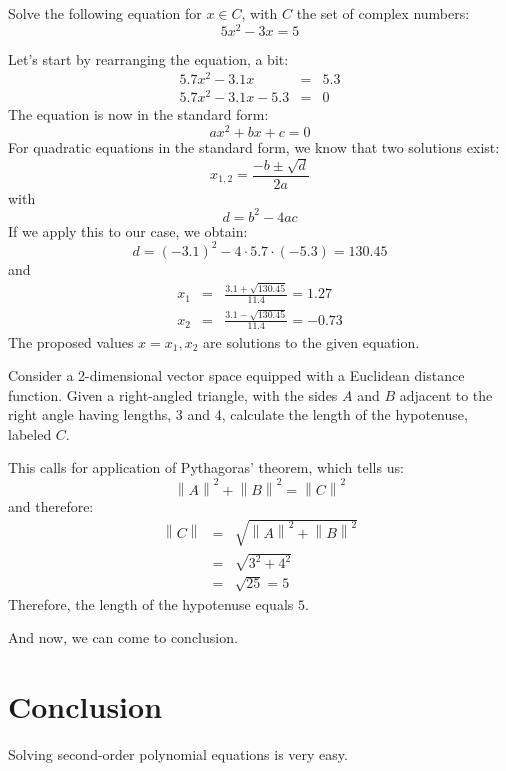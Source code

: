 \documentclass[a4paper,10pt]{article}
\begin{document}
\begin{exercises}[columns = 2]

  \begin{exercise}
    Solve the following equation for $x \in C$, with $C$ the set of
    complex numbers:
    \begin{equation}
      5 x^2 -3 x = 5
    \end{equation}
  \end{exercise}
  \begin{solution}
    Let's start by rearranging the equation, a bit:
    \begin{eqnarray}
      5.7 x^2 - 3.1 x &=& 5.3\\
      5.7 x^2 - 3.1 x -5.3 &=& 0
    \end{eqnarray}
    The equation is now in the standard form:
    \begin{equation}
      a x^2 + b x + c = 0
    \end{equation}
    For quadratic equations in the standard form, we know that two
    solutions exist:
    \begin{equation}
      x_{1,2} = \frac{ -b \pm \sqrt{d}}{2a}
    \end{equation}
    with
    \begin{equation}
      d = b^2 - 4 a c
    \end{equation}
    If we apply this to our case, we obtain:
    \begin{equation}
      d = (-3.1)^2 - 4 \cdot 5.7 \cdot (-5.3) = 130.45
    \end{equation}
    and
    \begin{eqnarray}
      x_1 &=& \frac{3.1 + \sqrt{130.45}}{11.4} = 1.27\\
      x_2 &=& \frac{3.1 - \sqrt{130.45}}{11.4} = -0.73
    \end{eqnarray}
    The proposed values $x = x_1, x_2$ are solutions to the given equation.
  \end{solution}
  \begin{exercise}
    Consider a 2-dimensional vector space equipped with a Euclidean
    distance function. Given a right-angled triangle, with the sides
    $A$ and $B$ adjacent to the right angle having lengths, $3$ and
    $4$, calculate the length of the hypotenuse, labeled $C$.
  \end{exercise}
  \begin{solution}
    This calls for application of Pythagoras' theorem, which
    tells us:
    \begin{equation}
      \left\|A\right\|^2 + \left\|B\right\|^2 = \left\|C\right\|^2
    \end{equation}
    and therefore:
    \begin{eqnarray}
      \left\|C\right\|
      &=& \sqrt{\left\|A\right\|^2 + \left\|B\right\|^2}\\
      &=& \sqrt{3^2 + 4^2}\\
      &=& \sqrt{25} = 5
    \end{eqnarray}
    Therefore, the length of the hypotenuse equals $5$.
  \end{solution}
\end{exercises}
And now, we can come to conclusion.

\section{Conclusion}
Solving second-order polynomial equations is very easy.
\end{document}
